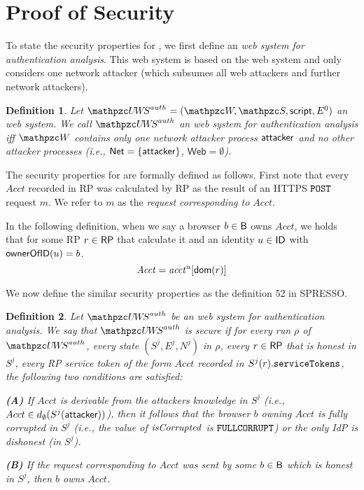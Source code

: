 \documentclass[letterpaper,onecolumn,10pt]{article}
\newtheorem{definition}{Definition}
\begin{document}
\section{Proof of Security}

To state the security properties for \uppresso, we first
define an \emph{\uppresso web system for authentication analysis}. This
web system is based on the \uppresso web system and only considers one
network attacker (which subsumes all web attackers and further network
attackers).

\begin{definition}
  Let $\uppressoauthwebsystem = (\bidsystem, \scriptset, \mathsf{script}, E^0)$
  an \uppresso web system. We call $\uppressoauthwebsystem$ an
  \emph{\uppresso web system for authentication analysis} iff
  $\bidsystem$ contains only one network attacker process
  $\mathsf{attacker}$ and no other attacker processes (i.e.,
  $\mathsf{Net} = \{\mathsf{attacker}\}$, $\mathsf{Web} = \emptyset$).
\end{definition}

The security properties for \uppresso are formally defined 
as follows. First note that every $Acct$ recorded in RP was
calculated by RP as the result of an HTTPS $\mathtt{POST}$ request 
$m$. We refer to $m$ as the 
\emph{request corresponding to $Acct$}. 

In the following definition, when we say a browser 
$b\in \mathsf{B}$ owns $Acct$, we holds that for some RP 
$r\in \mathsf{RP}$ that calculate it and 
an identity $u\in \mathsf{ID}$ with $\mathsf{ownerOfID}(u) = b$.
\[\mathit{Acct}=\mathit{acct}^u[\mathsf{dom}(r)]\]

We now define the similar security properties as the definition 52 in SPRESSO. 

\begin{definition}\label{def:uppresso-security-property} 
  Let $\uppressoauthwebsystem$ be an \uppresso web system for authentication analysis. 
  We say that \emph{$\uppressoauthwebsystem$ is secure} if for every run $\rho$ of
  $\uppressoauthwebsystem$, every state $(S^j, E^j, N^j)$ in $\rho$,
  every $r\in \mathsf{RP}$ that is honest in $S^j$, every RP service token of the form 
  $Acct$ recorded in $S^j(r).\mathtt{serviceTokens}$, the following two conditions are
  satisfied:

  \textbf{(A)} If $Acct$ is derivable from the attackers knowledge
  in $S^j$ (i.e., $Acct \in d_{\emptyset}(S^j(\mathsf{attacker}))$),
  then it follows that the browser $b$ owning $Acct$ is fully corrupted
  in $S^j$ (i.e., the value of $\mathit{isCorrupted}$ is $\mathtt{FULLCORRUPT}$)
  or the only IdP is dishonest (in $S^j$).

  \textbf{(B)} If the request corresponding to $Acct$ was sent by
  some $b\in \mathsf{B}$ which is honest in $S^j$, then $b$ owns $Acct$.
\end{definition}
\end{document}
